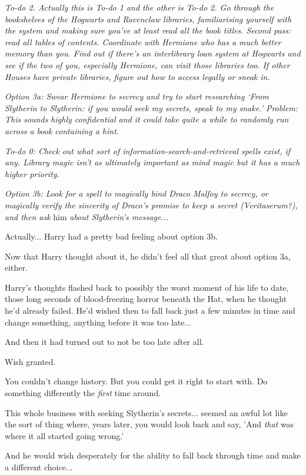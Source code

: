 \emph{To-do 2. Actually this is To-do 1 and the other is To-do 2. Go through the bookshelves of the Hogwarts and Ravenclaw libraries, familiarising yourself with the system and making sure you've at least read all the book titles. Second pass: read all tables of contents. Coordinate with Hermione who has a much better memory than you. Find out if there's an interlibrary loan system at Hogwarts and see if the two of you, especially Hermione, can visit those libraries too. If other Houses have private libraries, figure out how to access legally or sneak in.}

\emph{Option 3a: Swear Hermione to secrecy and try to start researching `From Slytherin to Slytherin: if you would seek my secrets, speak to my snake.' Problem: This sounds highly confidential and it could take quite a while to randomly run across a book containing a hint.}

\emph{To-do 0: Check out what sort of information-search-and-retrieval spells exist, if any. Library magic isn't as ultimately important as mind magic but it has a much higher priority.}

\emph{Option 3b: Look for a spell to magically bind Draco Malfoy to secrecy, or magically verify the sincerity of Draco's promise to keep a secret (Veritaserum?), and then ask} him \emph{about Slytherin's message...}

Actually... Harry had a pretty bad feeling about option 3b.

Now that Harry thought about it, he didn't feel all that great about option 3a, either.

Harry's thoughts flashed back to possibly the worst moment of his life to date, those long seconds of blood-freezing horror beneath the Hat, when he thought he'd already failed. He'd wished then to fall back just a few minutes in time and change something, anything before it was too late...

And then it had turned out to not be too late after all.

Wish granted.

You couldn't change history. But you could get it right to start with. Do something differently the \emph{first} time around.

This whole business with seeking Slytherin's secrets... seemed an awful lot like the sort of thing where, years later, you would look back and say, 'And \emph{that} was where it all started going wrong.'

And he would wish desperately for the ability to fall back through time and make a different choice...

